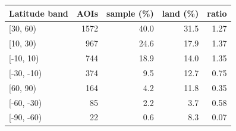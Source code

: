 \begin{tabular}{lrrrr}
\toprule
Latitude band & AOIs & sample (\%) & land (\%) & ratio \\
\midrule
[30, 60) & 1572 & 40.0 & 31.5 & 1.27 \\
[10, 30) & 967 & 24.6 & 17.9 & 1.37 \\
[-10, 10) & 744 & 18.9 & 14.0 & 1.35 \\
[-30, -10) & 374 & 9.5 & 12.7 & 0.75 \\
[60, 90) & 164 & 4.2 & 11.8 & 0.35 \\
[-60, -30) & 85 & 2.2 & 3.7 & 0.58 \\
[-90, -60) & 22 & 0.6 & 8.3 & 0.07 \\
\bottomrule
\end{tabular}
